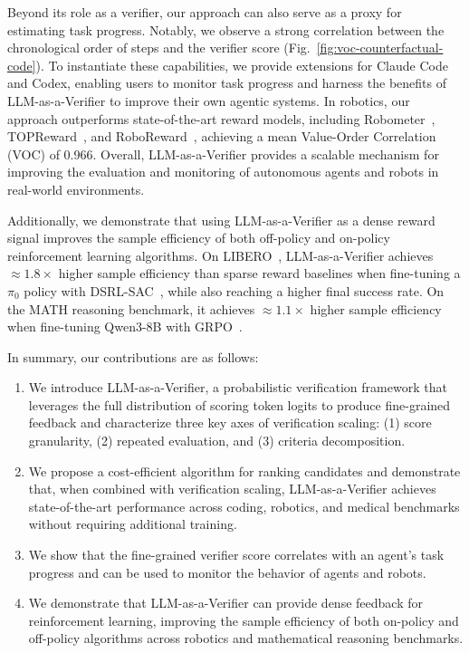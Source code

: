 Beyond its role as a verifier, our approach can also serve as a proxy for estimating task progress. Notably, we observe a strong correlation between the chronological order of steps and the verifier score (Fig.~\ref{fig:voc-counterfactual-code}). To instantiate these capabilities, we provide extensions for Claude Code and Codex, enabling users to monitor task progress and harness the benefits of LLM-as-a-Verifier to improve their own agentic systems. In robotics, our approach outperforms state-of-the-art reward models, including Robometer~\citep{liang2026robometer}, TOPReward~\citep{chen2026topreward}, and RoboReward~\citep{lee2026roboreward}, achieving a mean Value-Order Correlation (VOC) of 0.966. Overall, LLM-as-a-Verifier provides a scalable mechanism for improving the evaluation and monitoring of autonomous agents and robots in real-world environments.

Additionally, we demonstrate that using LLM-as-a-Verifier as a dense reward signal improves the sample efficiency of both off-policy and on-policy reinforcement learning algorithms. On LIBERO~\cite{liu2023liberobenchmarkingknowledgetransfer}, LLM-as-a-Verifier achieves $\approx1.8\times$ higher sample efficiency than sparse reward baselines when fine-tuning a $\pi_0$ policy with DSRL-SAC~\cite{wagenmaker2025steeringdiffusionpolicylatent}, while also reaching a higher final success rate. On the MATH reasoning benchmark, it achieves $\approx1.1\times$ higher sample efficiency when fine-tuning Qwen3-8B with GRPO~\cite{deepseek-ai_deepseek-r1_2025}.
\clearpage

In summary, our contributions are as follows:

\begin{enumerate}
\item We introduce LLM-as-a-Verifier, a probabilistic verification framework that leverages the full distribution of scoring token logits to produce fine-grained feedback and characterize three key axes of verification scaling: (1) score granularity, (2) repeated evaluation, and (3) criteria decomposition.

\item 
We propose a cost-efficient algorithm for ranking candidates and demonstrate that, when combined with verification scaling, LLM-as-a-Verifier achieves state-of-the-art performance across coding, robotics, and medical benchmarks without requiring additional training.

\item
We show that the fine-grained verifier score correlates with an agent's task progress and can be used to monitor the behavior of agents and robots.

\item
We demonstrate that LLM-as-a-Verifier can provide dense feedback for reinforcement learning, improving the sample efficiency of both on-policy and off-policy algorithms across robotics and mathematical reasoning benchmarks.


\end{enumerate}